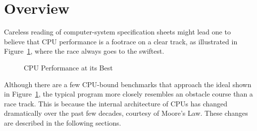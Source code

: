 
\section{Overview}
\label{sec:cpu:Overview}

Careless reading of computer-system specification sheets might lead one
to believe that CPU performance is a footrace on a clear track, as
illustrated in Figure~\ref{fig:cpu:CPU Performance at its Best},
where the race always goes to the swiftest.

\begin{figure}[htb]
\begin{center}
\end{center}
\caption{CPU Performance at its Best}
\label{fig:cpu:CPU Performance at its Best}
\end{figure}

Although there are a few CPU-bound benchmarks that approach the ideal
shown in Figure~\ref{fig:cpu:CPU Performance at its Best},
the typical program more closely resembles an obstacle course than
a race track.
This is because the internal architecture of CPUs has changed dramatically
over the past few decades, courtesy of Moore's Law.
These changes are described in the following sections.

